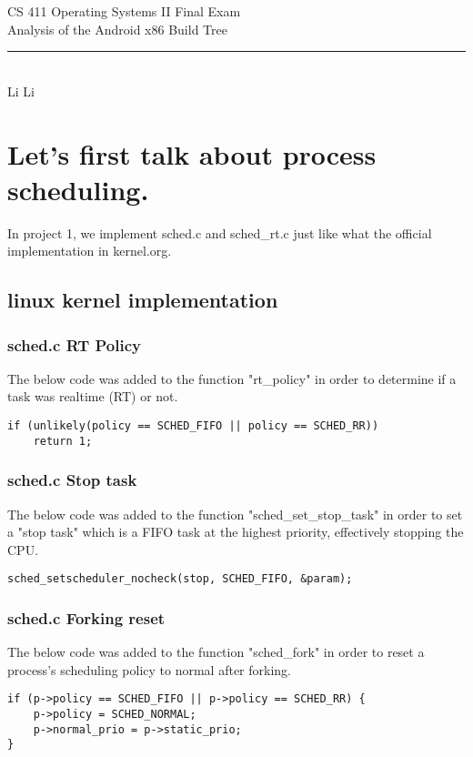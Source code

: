 \documentclass[12pt,letterpaper]{article}
\begin{document}
\begin{titlepage}
    \vspace*{4cm}
    \begin{flushleft}
    {\huge
        CS 411 Operating Systems II Final Exam\\[.5cm]
    }
    {\large
        Analysis of the Android x86 Build Tree
    }
    \end{flushleft}
    \vfill
    \rule{5in}{.5mm}\\
    Li Li

\end{titlepage}
\section{Let's first talk about process scheduling.}
\indent In project 1, we implement sched.c and sched_rt.c just like what the official implementation in kernel.org.
\subsection{linux kernel implementation}
\subsubsection{sched.c RT Policy}
The below code was added to the function "rt_policy" in order to determine if a
task was realtime (RT) or not.
\begin{Verbatim}[frame=single]
if (unlikely(policy == SCHED_FIFO || policy == SCHED_RR))
	return 1;
\end{Verbatim}
\subsubsection{sched.c Stop task}
The below code was added to the function "sched_set_stop_task" in order to set
a "stop task" which is a FIFO task at the highest priority,
effectively stopping the CPU.
\begin{Verbatim}[frame=single]
sched_setscheduler_nocheck(stop, SCHED_FIFO, &param);
\end{Verbatim}
\subsubsection{sched.c Forking reset}
The below code was added to the function "sched_fork" in order to reset a
process's scheduling policy to normal after forking.
\begin{Verbatim}[frame=single]
if (p->policy == SCHED_FIFO || p->policy == SCHED_RR) {
	p->policy = SCHED_NORMAL;
	p->normal_prio = p->static_prio;
}
\end{Verbatim}
\end{document}
